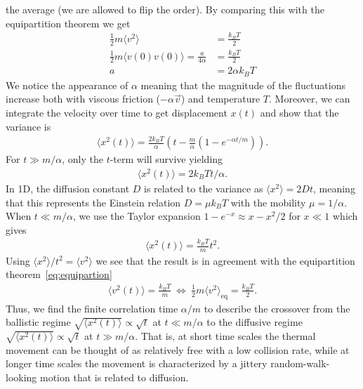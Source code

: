 the average (we are allowed to flip the order). By comparing this with the
equipartition theorem we get 
\begin{align*}
  \frac{1}{2}m\langle  v^2 \rangle &= \frac{k_BT}{2} \\
  \frac{1}{2}m\langle  v(0) v(0) \rangle = \frac{a}{4\alpha} &= \frac{k_BT}{2} \\
  a &=  2\alpha k_B T 
\end{align*}
We notice the appearance of $\alpha$ meaning that the magnitude of the
fluctuations increase both with viscous friction ($-\alpha \vec{v}$) and temperature $T$. Moreover, we can
integrate the velocity over time to get displacement $x(t)$ and show that the
variance is~\cite{stat_phys}
\begin{align*}
  \big\langle x^2(t) \big\rangle = \frac{2 k_B T}{\alpha} \left(t - \frac{m}{\alpha}\left(1 - e^{-\alpha t/m} \right) \right).
\end{align*}
For $t \gg m/\alpha$, only the $t$-term will survive yielding
\begin{align*}
  \langle x^2(t) \rangle = 2 k_BTt/\alpha.
\end{align*}
In 1D, the diffusion constant $D$ is related to the variance as $\langle x^2
\rangle = 2Dt$, meaning that this represents the Einstein relation $D = \mu k_B
T$ with the mobility $\mu = 1/\alpha$. When $t \ll m/\alpha$, we use the Taylor expansion $1 - e^{-x} \approx x - x^2/2$
for $x\ll 1$ which gives
\begin{align*}
  \big\langle x^2(t) \big\rangle = \frac{k_B T}{m} t^2.
\end{align*}
Using $\langle x^2 \rangle / t^2 = \langle v^2 \rangle$ we see that the result is in agreement with the equipartition theorem~\cref{eq:equipartion}
\begin{align*}
  \big\langle v^2(t) \big\rangle = \frac{k_B T}{m} \ \Longleftrightarrow \ \frac{1}{2}m\langle v^2 \rangle_{\text{eq}} = \frac{k_B T}{2}.
\end{align*}
Thus, we find the finite correlation time $\alpha/m$ to describe the crossover from the ballistic regime $\sqrt{\langle x^2(t)
\rangle} \propto \sqrt{t}$ at $t \ll m/\alpha$ to the diffusive regime $\sqrt{\langle x^2(t)\rangle} \propto \sqrt{t}$ at $t \gg m/\alpha$. That is, at short time scales the thermal movement can be thought of as relatively free with a low collision rate, while at longer time scales the movement is characterized by a jittery random-walk-looking motion that is related to diffusion. 


